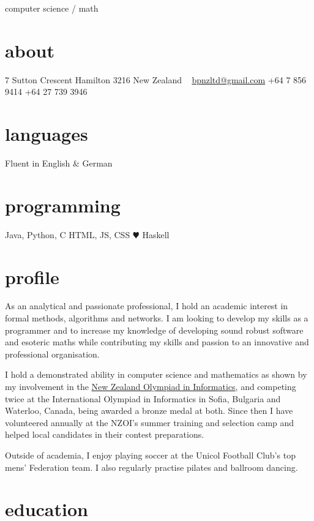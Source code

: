 \documentclass[]{boris-cv}
\begin{document}
       {computer science / math}

\begin{aside}
  \section{about}
    7 Sutton Crescent
    Hamilton 3216
    New Zealand
    ~
    \href{mailto:bpnzltd@gmail.com}{bpnzltd@gmail.com}
    +64 7 856 9414
    +64 27 739 3946
  \section{languages}
    Fluent in 
    English \& German
  \section{programming}
    Java, Python, C
    HTML, JS, CSS
    {\color{red} $\varheartsuit$} Haskell
\end{aside}

\section{profile}

As an analytical and passionate professional, I hold an academic interest in
formal methods, algorithms and networks. I am looking to develop my skills as
a programmer and to increase my knowledge of developing sound robust software
and esoteric maths while contributing my skills and passion to an innovative
and professional organisation.

I hold a demonstrated ability in computer science and mathematics as shown by
my involvement in the \href{http://www.nzoi.org.nz/} {New Zealand Olympiad in
Informatics}, and competing twice at the International Olympiad in
Informatics in Sofia, Bulgaria and Waterloo, Canada, being awarded a bronze
medal at both. Since then I have volunteered annually at the NZOI's summer
training and selection camp and helped local candidates in their contest
preparations.

Outside of academia, I enjoy playing soccer at the Unicol Football Club's top
mens' Federation team. I also regularly practise pilates and ballroom
dancing.
\\
\section{education}
\end{document}
